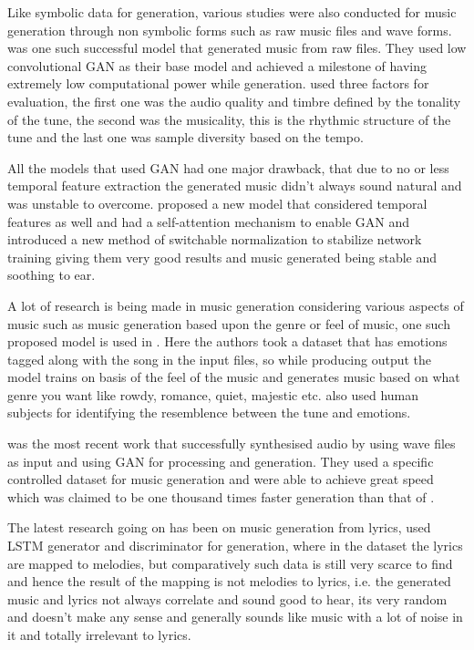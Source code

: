 \documentclass[oneside,12pt]{Classes/RoboticsLaTeX}
\begin{document}
Like symbolic data for generation, various studies were also conducted for music generation through non symbolic forms such as raw music files and wave forms. \cite{mp3net} was one such successful model that generated music from raw files. They used low convolutional GAN as their base model and achieved a milestone of having extremely low computational power while generation. \cite{mp3net} used three factors for evaluation, the first one was the audio quality and timbre defined by the tonality of the tune, the second was the musicality, this is the rhythmic structure of the tune and the last one was sample diversity based on the tempo.

All the models that used GAN had one major drawback, that due to no or less temporal feature extraction the generated music didn't always sound natural and was unstable to overcome. \cite{dmbgan} proposed a new model that considered temporal features as well and had a self-attention mechanism to enable GAN and introduced a new method of switchable normalization to stabilize network training giving them very good results and music generated being stable and soothing to ear.

A lot of research is being made in music generation considering various aspects of music such as music generation based upon the genre or feel of music, one such proposed model is used in \cite{cvaegan}. Here the authors took a dataset that has emotions tagged along with the song in the input files, so while producing output the model trains on basis of the feel of the music and generates music based on what genre you want like rowdy, romance, quiet, majestic etc. \cite{cvaegan} also used human subjects for identifying the resemblence between the tune and emotions.

\cite{gansynth} was the most recent work that successfully synthesised audio by using wave files as input and using GAN for processing and generation. They used a specific controlled dataset for music generation and were able to achieve great speed which was claimed to be one thousand times faster generation than that of  \cite{wavenet}.

The latest research going on has been on music generation from lyrics, \cite{lstmgan} used LSTM generator and discriminator for generation, where in the dataset the lyrics are mapped to melodies, but comparatively such data is still very scarce to find and hence the result of the mapping is not melodies to lyrics, i.e. the generated music and lyrics not always correlate and sound good to hear, its very random and doesn't make any sense and generally sounds like music with a lot of noise in it and totally irrelevant to lyrics.
\end{document}

